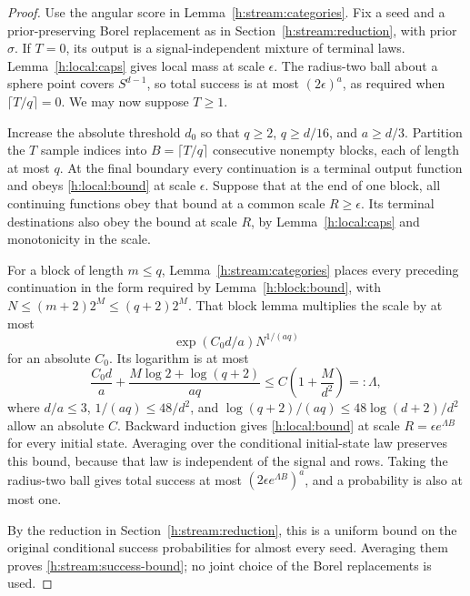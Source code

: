 \begin{proof}
Use the angular score in Lemma~\ref{h:stream:categories}. Fix a seed
and a prior-preserving Borel replacement as in
Section~\ref{h:stream:reduction}, with prior $\sigma$.
If $T=0$, its output is a signal-independent mixture of terminal laws.
Lemma~\ref{h:local:caps} gives local mass at scale $\epsilon$.
The radius-two ball about a sphere point covers $S^{d-1}$, so total
success is at most $(2\epsilon)^a$, as required when
$\lceil T/q\rceil=0$. We may now suppose $T\ge1$.

Increase the absolute threshold $d_0$ so that
$q\ge2$, $q\ge d/16$, and $a\ge d/3$. Partition the $T$ sample
indices into $B=\lceil T/q\rceil$ consecutive nonempty blocks, each
of length at most $q$. At the final boundary every continuation is
a terminal output function and obeys \eqref{h:local:bound} at scale
$\epsilon$. Suppose that at the end of one block, all continuing
functions obey that bound at a common scale $R\ge\epsilon$. Its
terminal destinations also obey the bound at scale $R$, by
Lemma~\ref{h:local:caps} and monotonicity in the scale.

For a block of length $m\le q$, Lemma~\ref{h:stream:categories}
places every preceding continuation in the form required by
Lemma~\ref{h:block:bound}, with
$N\le(m+2)2^M\le(q+2)2^M$. That block lemma multiplies the scale
by at most
\[
 \exp(C_0d/a)N^{1/(aq)}
\]
for an absolute $C_0$. Its logarithm is at most
\begin{equation}\label{h:stream:multiplier}
 \frac{C_0d}{a}+
 \frac{M\log2+\log(q+2)}{aq}
 \le C\left(1+\frac{M}{d^2}\right)=:\Lambda,
\end{equation}
where $d/a\le3$, $1/(aq)\le48/d^2$, and
$\log(q+2)/(aq)\le48\log(d+2)/d^2$ allow an absolute $C$.
Backward induction gives \eqref{h:local:bound} at scale
$R=\epsilon e^{\Lambda B}$ for every initial state. Averaging over
the conditional initial-state law preserves this bound, because that
law is independent of the signal and rows. Taking the radius-two ball
gives total success at most $(2\epsilon e^{\Lambda B})^a$, and a
probability is also at most one.

By the reduction in Section~\ref{h:stream:reduction}, this is a
uniform bound on the original conditional success probabilities for
almost every seed. Averaging them proves
\eqref{h:stream:success-bound}; no joint choice of the Borel
replacements is used.
\end{proof}
